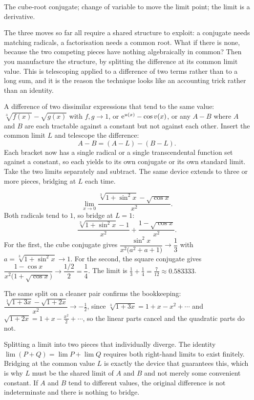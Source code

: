 \begin{seealsob}The cube-root conjugate; change of variable to move the limit point; the limit is a derivative.\end{seealsob}

The three moves so far all require a shared structure to exploit: a conjugate needs matching radicals, a factorisation needs a common root. What if there is none, because the two competing pieces have nothing algebraically in common? Then you manufacture the structure, by splitting the difference at its common limit value. This is telescoping applied to a difference of two terms rather than to a long sum, and it is the reason the technique looks like an accounting trick rather than an identity.

\cue A difference of two dissimilar expressions that tend to the same value: $\sqrt[3]{f(x)}-\sqrt{g(x)}$ with $f,g\to1$, or $\mathrm{e}^{u(x)}-\cos v(x)$, or any $A-B$ where $A$ and $B$ are each tractable against a constant but not against each other.
\method Insert the common limit $L$ and telescope the difference:
\[A-B=(A-L)-(B-L).\]
Each bracket now has a single radical or a single transcendental function set against a constant, so each yields to its own conjugate or its own standard limit. Take the two limits separately and subtract. The same device extends to three or more pieces, bridging at $L$ each time.

\begin{worked}
\[\lim_{x\to0}\frac{\sqrt[3]{1+\sin^{2}x}-\sqrt{\cos x}}{x^{2}}.\]
Both radicals tend to $1$, so bridge at $L=1$:
\[\frac{\sqrt[3]{1+\sin^{2}x}-1}{x^{2}}+\frac{1-\sqrt{\cos x}}{x^{2}}.\]
For the first, the cube conjugate gives $\dfrac{\sin^{2}x}{x^{2}\bigl(a^{2}+a+1\bigr)}\to\dfrac{1}{3}$ with $a=\sqrt[3]{1+\sin^{2}x}\to1$. For the second, the square conjugate gives $\dfrac{1-\cos x}{x^{2}\bigl(1+\sqrt{\cos x}\bigr)}\to\dfrac{1/2}{2}=\dfrac14$. The limit is $\tfrac13+\tfrac14=\tfrac{7}{12}\approx0.583333$.

The same split on a cleaner pair confirms the bookkeeping: $\dfrac{\sqrt[3]{1+3x}-\sqrt{1+2x}}{x^{2}}\to-\tfrac12$, since $\sqrt[3]{1+3x}=1+x-x^{2}+\cdots$ and $\sqrt{1+2x}=1+x-\tfrac{x^{2}}{2}+\cdots$, so the linear parts cancel and the quadratic parts do not.
\end{worked}

\begin{trap}
Splitting a limit into two pieces that individually diverge. The identity $\lim(P+Q)=\lim P+\lim Q$ requires both right-hand limits to exist finitely. Bridging at the common value $L$ is exactly the device that guarantees this, which is why $L$ must be the shared limit of $A$ and $B$ and not merely some convenient constant. If $A$ and $B$ tend to different values, the original difference is not indeterminate and there is nothing to bridge.
\end{trap}


